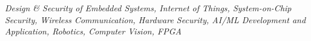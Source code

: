 
\begin{rSection}
    \textit{ Design \& Security of Embedded Systems, Internet of Things, System-on-Chip Security,  Wireless Communication, Hardware Security, AI/ML Development and Application, Robotics, Computer Vision, FPGA}
\end{rSection}